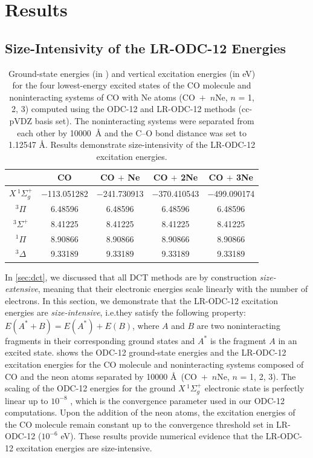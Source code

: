 \section{Results}
\label{sec:results}

\subsection{Size-Intensivity of the LR-ODC-12 Energies}
\label{sec:size_intensivity}

\begin{table}[h!]
    \caption{%
        \label{tab:size_int}
        Ground-state energies (in \hartree) and vertical excitation energies (in
        eV) for the four lowest-energy excited states of the CO molecule and
        noninteracting systems of CO with Ne atoms (\mbox{CO $+$ $n$Ne}, $n$ =
        1, 2, 3) computed using the ODC-12 and LR-ODC-12 methods (cc-pVDZ basis
        set).
        The noninteracting systems were separated from each other by \mbox{10000
        \AA} and the C--O bond distance was set to 1.12547 \AA\@.
        Results demonstrate size-intensivity of the LR-ODC-12 excitation
        energies.
    }
    \begin{tabular}{ccccc}
        \hline
        \hline
        & CO & CO $+$ Ne & CO $+$ 2Ne & CO $+$ 3Ne \\
        \hline
        \({X}\,^1\Sigma_g^+\) & $-$113.051282 & $-$241.730913 & $-$370.410543 & $-$499.090174\\
        \({}^3\Pi\) & 6.48596 & 6.48596 & 6.48596 & 6.48596 \\
        \({}^3\Sigma^+\) & 8.41225 & 8.41225 & 8.41225 & 8.41225 \\
        \({}^1\Pi\) & 8.90866 & 8.90866 & 8.90866 & 8.90866 \\
        \({}^3\Delta\) & 9.33189 & 9.33189 & 9.33189 & 9.33189 \\
        \hline
        \hline
    \end{tabular}
\end{table}

In \cref{sec:dct}, we discussed that all DCT methods are by construction {\it size-extensive}, meaning that their electronic energies scale linearly with the number of electrons.
In this section, we demonstrate that the LR-ODC-12 excitation energies are {\it
size-intensive}, i.e.\@ they satisfy the following property: $E(A^*+B) = E(A^*)
+ E(B)$, where $A$ and $B$ are two noninteracting fragments in their
corresponding ground states and $A^*$ is the fragment $A$ in an excited state.
 shows the ODC-12 ground-state energies and the LR-ODC-12
excitation energies for the CO molecule and noninteracting systems composed of
CO and the neon atoms separated by 10000 \AA\ (\mbox{CO $+$ $n$Ne}, $n$ = 1, 2,
3).
The scaling of the ODC-12 energies for the ground \({X}\,^1\Sigma_g^+\)
electronic state is perfectly linear up to $10^{-8}$ \hartree, which is the
convergence parameter used in our ODC-12 computations.
Upon the addition of the neon atoms, the excitation energies of the CO molecule
remain constant up to the convergence threshold set in LR-ODC-12 ($10^{-6}$
eV).
These results provide numerical evidence that the LR-ODC-12 excitation energies
are size-intensive.


